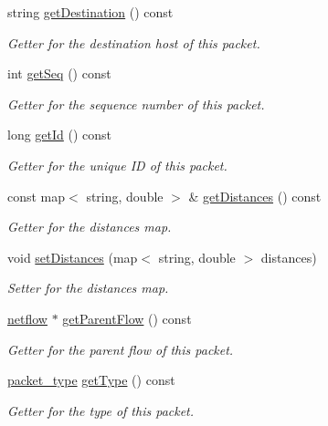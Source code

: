 \begin{DoxyCompactItemize}
string \hyperlink{classpacket_a1b2e0681850de65dd7cf384a0ac62b36}{get\-Destination} () const 
\begin{DoxyCompactList}\small\item\em Getter for the destination host of this packet. \end{DoxyCompactList}\item 
int \hyperlink{classpacket_a73ded904b5e293e7e33ae1a57d470fd5}{get\-Seq} () const 
\begin{DoxyCompactList}\small\item\em Getter for the sequence number of this packet. \end{DoxyCompactList}\item 
long \hyperlink{classpacket_a6bd880d868f03dd6ac2ef29053e6612d}{get\-Id} () const 
\begin{DoxyCompactList}\small\item\em Getter for the unique I\-D of this packet. \end{DoxyCompactList}\item 
const map$<$ string, double $>$ \& \hyperlink{classpacket_a65ccf9c5fd0833c0070b62204268d533}{get\-Distances} () const 
\begin{DoxyCompactList}\small\item\em Getter for the distances map. \end{DoxyCompactList}\item 
void \hyperlink{classpacket_a989bc3f928b4254b6130e286bff83db6}{set\-Distances} (map$<$ string, double $>$ distances)
\begin{DoxyCompactList}\small\item\em Setter for the distances map. \end{DoxyCompactList}\item 
\hyperlink{classnetflow}{netflow} $\ast$ \hyperlink{classpacket_aa6a8a41c8147772a01a97c1100b9ed11}{get\-Parent\-Flow} () const 
\begin{DoxyCompactList}\small\item\em Getter for the parent flow of this packet. \end{DoxyCompactList}\item 
\hyperlink{util_8h_ad875bcb78f9bd8625c5e454cafdc8de7}{packet\-\_\-type} \hyperlink{classpacket_ae71a8e7630d96485dac3b2a68371caff}{get\-Type} () const 
\begin{DoxyCompactList}\small\item\em Getter for the type of this packet. \end{DoxyCompactList}\item 

\end{DoxyCompactItemize}
